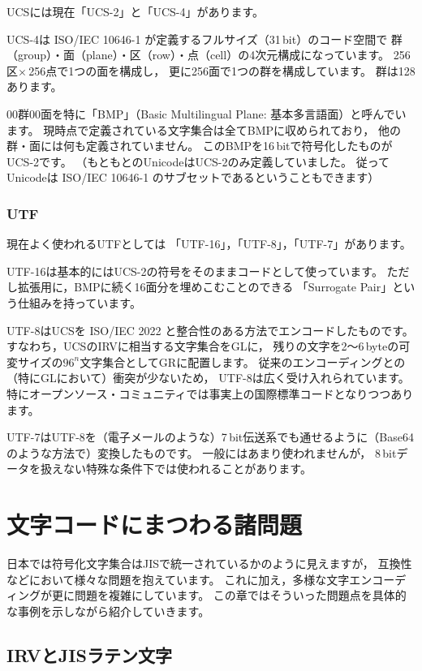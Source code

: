 \documentclass[a4j,10pt,fleqn,uplatex]{jsarticle}
\begin{document}
UCSには現在「UCS-2」と「UCS-4」があります。

UCS-4は ISO/IEC 10646-1 が定義するフルサイズ（31\,bit）のコード空間で
群（group）・面（plane）・区（row）・点（cell）の4次元構成になっています。
256区$\times$\,256点で1つの面を構成し，
更に256面で1つの群を構成しています。
群は128あります。

00群00面を特に「BMP」（Basic Multilingual Plane: 基本多言語面）と呼んでいます。
現時点で定義されている文字集合は全てBMPに収められており，
他の群・面には何も定義されていません。
このBMPを16\,bitで符号化したものがUCS-2です。
（もともとのUnicodeはUCS-2のみ定義していました。
従ってUnicodeは ISO/IEC 10646-1 のサブセットであるということもできます）

\subsubsection{UTF}

現在よく使われるUTFとしては
「UTF-16」，「UTF-8」，「UTF-7」があります。

UTF-16は基本的にはUCS-2の符号をそのままコードとして使っています。
ただし拡張用に，BMPに続く16面分を埋めこむことのできる
「Surrogate Pair」という仕組みを持っています。

UTF-8はUCSを ISO/IEC 2022 と整合性のある方法でエンコードしたものです。
すなわち，UCSのIRVに相当する文字集合をGLに，
残りの文字を2～6\,byteの可変サイズの$96^n$文字集合としてGRに配置します。
従来のエンコーディングとの（特にGLにおいて）衝突が少ないため，
UTF-8は広く受け入れられています。
特にオープンソース・コミュニティでは事実上の国際標準コードとなりつつあります。

UTF-7はUTF-8を（電子メールのような）7\,bit伝送系でも通せるように（Base64のような方法で）変換したものです。
一般にはあまり使われませんが，
8\,bitデータを扱えない特殊な条件下では使われることがあります。


\section{文字コードにまつわる諸問題}

日本では符号化文字集合はJISで統一されているかのように見えますが，
互換性などにおいて様々な問題を抱えています。
これに加え，多様な文字エンコーディングが更に問題を複雑にしています。
この章ではそういった問題点を具体的な事例を示しながら紹介していきます。


\subsection{IRVとJISラテン文字}
\end{document}
